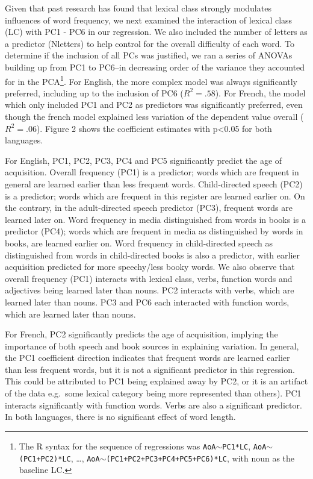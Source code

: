 \documentclass[10pt, letterpaper]{article}
\begin{document}
Given that past research has found that lexical class strongly modulates
influences of word frequency, we next examined the interaction of
lexical class (LC) with PC1 - PC6 in our regression. We also included
the number of letters as a predictor (Nletters) to help control for the
overall difficulty of each word. To determine if the inclusion of all
PCs was justified, we ran a series of ANOVAs building up from PC1 to
PC6--in decreasing order of the variance they accounted for in the
PCA\footnote{The R syntax for the sequence of regressions was
  \texttt{AoA}\(\sim\)\texttt{PC1*LC},
  \texttt{AoA}\(\sim\)\texttt{(PC1+PC2)*LC}, \ldots,
  \texttt{AoA}\(\sim\)\texttt{(PC1+PC2+PC3+PC4+PC5+PC6)*LC}, with noun
  as the baseline LC.}. For English, the more complex model was always
significantly preferred, including up to the inclusion of PC6
(\(R^2 = .58\)). For French, the model which only included PC1 and PC2
as predictors was significantly preferred, even though the french model
explained less variation of the dependent value overall (\(R^2 = .06\)).
Figure 2 shows the coefficient estimates with p\textless0.05 for both
languages.

For English, PC1, PC2, PC3, PC4 and PC5 significantly predict the age of
acquisition. Overall frequency (PC1) is a predictor; words which are
frequent in general are learned earlier than less frequent words.
Child-directed speech (PC2) is a predictor; words which are frequent in
this register are learned earlier on. On the contrary, in the
adult-directed speech predictor (PC3), frequent words are learned later
on. Word frequency in media distinguished from words in books is a
predictor (PC4); words which are frequent in media as distinguished by
words in books, are learned earlier on. Word frequency in child-directed
speech as distinguished from words in child-directed books is also a
predictor, with earlier acquisition predicted for more speechy/less
booky words. We also observe that overall frequency (PC1) interacts with
lexical class, verbs, function words and adjectives being learned later
than nouns. PC2 interacts with verbs, which are learned later than
nouns. PC3 and PC6 each interacted with function words, which are
learned later than nouns.

For French, PC2 significantly predicts the age of acquisition, implying
the importance of both speech and book sources in explaining variation.
In general, the PC1 coefficient direction indicates that frequent words
are learned earlier than less frequent words, but it is not a
significant predictor in this regression. This could be attributed to
PC1 being explained away by PC2, or it is an artifact of the data
e.g.~some lexical category being more represented than others). PC1
interacts significantly with function words. Verbs are also a
significant predictor. In both languages, there is no significant effect
of word length.
\end{document}
